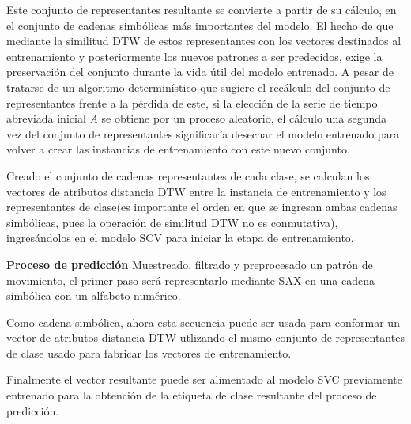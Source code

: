 	\hfill\break
	\justifying
	Este conjunto de representantes resultante se convierte a partir de su cálculo, en el conjunto de cadenas simbólicas más importantes del modelo. El hecho de que mediante la similitud DTW de estos representantes con los vectores destinados al entrenamiento y posteriormente los nuevos patrones a ser predecidos, exige la preservación del conjunto durante la vida útil del modelo entrenado. A pesar de tratarse de un algoritmo determinístico que sugiere el recálculo del conjunto de representantes frente a la pérdida de este, si la elección de la serie de tiempo abreviada inicial \textit{A} se obtiene por un proceso aleatorio, el cálculo una segunda vez del conjunto de representantes significaría desechar el modelo entrenado para volver a crear las instancias de entrenamiento con este nuevo conjunto.
	
	\hfill\break
	\justifying
	Creado el conjunto de cadenas representantes de cada clase, se calculan los vectores de atributos distancia DTW entre la instancia de entrenamiento y los representantes de clase(es importante el orden en que se ingresan ambas cadenas simbólicas, pues la operación de similitud DTW no es conmutativa), ingresándolos en el modelo SCV para iniciar la etapa de entrenamiento.
	
	\hfill\break
	\textbf{Proceso de predicción}
	\justifying
	Muestreado, filtrado y preprocesado un patrón de movimiento, el primer paso será representarlo mediante SAX en una cadena simbólica con un alfabeto numérico.
	
	\hfill\break
	\justifying
	Como cadena simbólica, ahora esta secuencia puede ser usada para conformar un vector de atributos distancia DTW utlizando el mismo conjunto de representantes de clase usado para fabricar los vectores de entrenamiento.
	
	\hfill\break
	\justifying
	Finalmente el vector resultante puede ser alimentado al modelo SVC previamente entrenado para la obtención de la etiqueta de clase resultante del proceso de predicción.